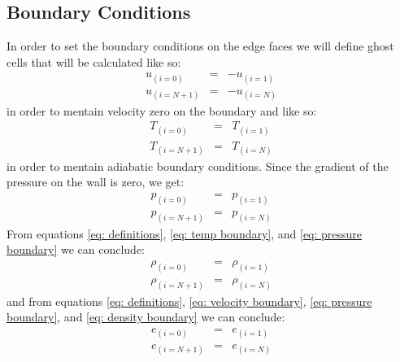 \documentclass[11pt, a4paper]{article}
\begin{document}
\subsection{Boundary Conditions}
In order to set the boundary conditions on the edge faces we will define ghost cells that will be calculated like so:
\begin{equation}
    \begin{array}{lcl}
        u_{\left(i=0\right)} &=& -u_{\left(i=1\right)} \\
        u_{\left(i=N+1\right)} &=& -u_{\left(i=N\right)}
    \end{array}
    \label{eq: velocity boundary}
\end{equation}
in order to mentain velocity zero on the boundary and like so:
\begin{equation}
    \begin{array}{lcl}
        T_{\left(i=0\right)} &=& T_{\left(i=1\right)} \\
        T_{\left(i=N+1\right)} &=& T_{\left(i=N\right)}
    \end{array}
    \label{eq: temp boundary}
\end{equation}
in order to mentain adiabatic boundary conditions.
Since the gradient of the pressure on the wall is zero, we get:
\begin{equation}
    \begin{array}{lcl}
        p_{\left(i=0\right)} &=& p_{\left(i=1\right)} \\
        p_{\left(i=N+1\right)} &=& p_{\left(i=N\right)}
    \end{array}
    \label{eq: pressure boundary}
\end{equation}
From equations \ref{eq: definitions}, \ref{eq: temp boundary}, and \ref{eq: pressure boundary} we can conclude:
\begin{equation}
    \begin{array}{lcl}
        \rho_{\left(i=0\right)} &=& \rho_{\left(i=1\right)} \\
        \rho_{\left(i=N+1\right)} &=& \rho_{\left(i=N\right)}
    \end{array}
    \label{eq: density boundary}
\end{equation}
and from equations \ref{eq: definitions}, \ref{eq: velocity boundary}, \ref{eq: pressure boundary}, and \ref{eq: density boundary} we can conclude:
\begin{equation}
    \begin{array}{lcl}
        e_{\left(i=0\right)} &=& e_{\left(i=1\right)} \\
        e_{\left(i=N+1\right)} &=& e_{\left(i=N\right)}
    \end{array}
    \label{eq: energy boundary}
\end{equation}
\newpage
\end{document}
